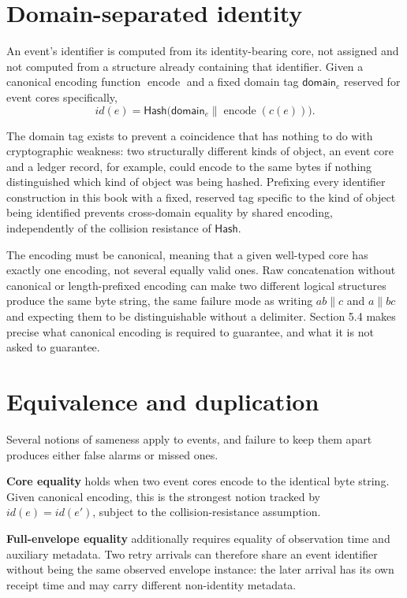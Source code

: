 \documentclass[11pt,openany]{book}
\newcommand{\Hash}{\mathsf{Hash}}
\begin{document}
\section{Domain-separated identity}

An event's identifier is computed from its identity-bearing core, not assigned
and not computed from a structure already containing that identifier. Given a
canonical encoding function \(\operatorname{encode}\) and a fixed domain tag
\(\mathsf{domain}_e\) reserved for event cores specifically,
\[
 id(e)=\Hash\bigl(\mathsf{domain}_e\parallel
                   \operatorname{encode}(c(e))\bigr).
\]

The domain tag exists to prevent a coincidence that has nothing to do with
cryptographic weakness: two structurally different kinds of object, an event
core and a ledger record, for example, could encode to the same bytes if
nothing distinguished which kind of object was being hashed. Prefixing every
identifier construction in this book with a fixed, reserved tag specific to
the kind of object being identified prevents cross-domain equality by shared
encoding, independently of the collision resistance of \(\Hash\).

The encoding must be canonical, meaning that a given well-typed core has
exactly one encoding, not several equally valid ones. Raw concatenation without
canonical or length-prefixed encoding can make two different logical
structures produce the same byte string, the same failure mode as writing
\(ab\parallel c\) and \(a\parallel bc\) and expecting them to be
distinguishable without a delimiter. Section 5.4 makes precise what canonical
encoding is required to guarantee, and what it is not asked to guarantee.

\section{Equivalence and duplication}

Several notions of sameness apply to events, and failure to keep them apart
produces either false alarms or missed ones.

\textbf{Core equality} holds when two event cores encode to the identical byte
string. Given canonical encoding, this is the strongest notion tracked by
\(id(e)=id(e')\), subject to the collision-resistance assumption.

\textbf{Full-envelope equality} additionally requires equality of observation
time and auxiliary metadata. Two retry arrivals can therefore share an event
identifier without being the same observed envelope instance: the later
arrival has its own receipt time and may carry different non-identity metadata.
\end{document}
